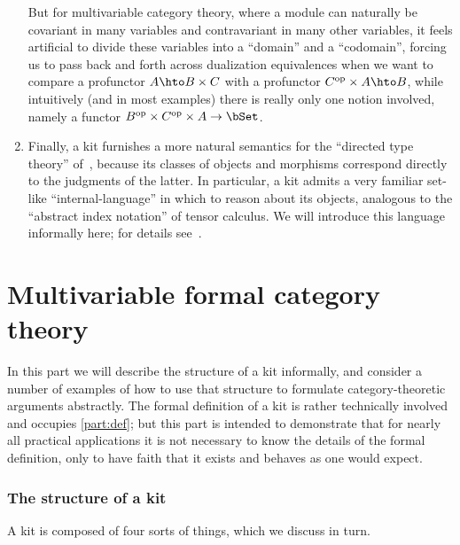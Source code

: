 \documentclass{amsart}
\begin{document}
\begin{enumerate}
  But for multivariable category theory, where a module can naturally be covariant in many variables and contravariant in many other variables, it feels artificial to divide these variables into a ``domain'' and a ``codomain'', forcing us to pass back and forth across dualization equivalences when we want to compare a profunctor $A \hto B\times C$ with a profunctor $C\op\times A \hto B$, while intuitively (and in most examples) there is really only one notion involved, namely a functor $B\op \times C\op \times A \to \bSet$.
\item Finally, a kit furnishes a more natural semantics for the ``directed type theory'' of~\cite{lnss:dirtt}, because its classes of objects and morphisms correspond directly to the judgments of the latter.
  In particular, a kit admits a very familiar set-like ``internal-language'' in which to reason about its objects, analogous to the ``abstract index notation'' of tensor calculus.
  We will introduce this language informally here; for details see~\cite{lnss:dirtt}.
\end{enumerate}

\part{Multivariable formal category theory}
\label{part:mfct}

In this part we will describe the structure of a kit informally, and consider a number of examples of how to use that structure to formulate category-theoretic arguments abstractly.
The formal definition of a kit is rather technically involved and occupies \cref{part:def}; but this part is intended to demonstrate that for nearly all practical applications it is not necessary to know the details of the formal definition, only to have faith that it exists and behaves as one would expect.

\section{The structure of a kit}
\label{sec:structure}

A kit is composed of four sorts of things, which we discuss in turn.
\end{document}
